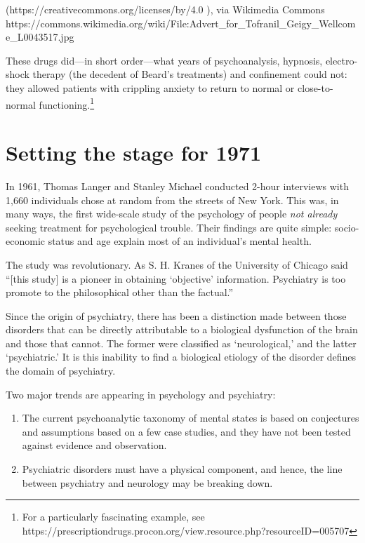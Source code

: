 \begin{refsection}
(https:\slash \slash creativecommons.org\slash licenses\slash by\slash 4.0 ), via Wikimedia Commons https:\slash \slash commons.wikimedia.org\slash wiki\slash File:Advert\_for\_Tofranil\_Geigy\_Wellcome\_L0043517.jpg 

These drugs did---in short order---what years of psychoanalysis, hypnosis, electro-shock therapy (the decedent of Beard's treatments) and confinement could not: they allowed patients with crippling anxiety to return to normal or close-to-normal functioning.\footnote{For a particularly fascinating example, see https:\slash \slash prescriptiondrugs.procon.org\slash view.resource.php?resourceID=005707}

\section{Setting the stage for 1971}
\label{settingthestagefor1971}

In 1961, Thomas Langer and Stanley Michael conducted 2-hour interviews with 1,660 individuals chose at random from the streets of New York. This was, in many ways, the first wide-scale study of the psychology of people \emph{not already} seeking treatment for psychological trouble. Their findings are quite simple: socio-economic status and age explain most of an individual's mental health. 

The study was revolutionary. As S. H. Kranes of the University of Chicago said ``[this study] is a pioneer in obtaining `objective' information. Psychiatry is too promote to the philosophical other than the factual.'' ~\citep{Kraines:1964fy}

Since the origin of psychiatry, there has been a distinction made between those disorders that can be directly attributable to a biological dysfunction of the brain and those that cannot. The former were classified as `neurological,' and the latter `psychiatric.' It is this inability to find a biological etiology of the disorder defines the domain of psychiatry.

Two major trends are appearing in psychology and psychiatry: 

\begin{enumerate}
\item The current psychoanalytic taxonomy of mental states is based on conjectures and assumptions based on a few case studies, and they have not been tested against evidence and observation.

\item Psychiatric disorders must have a physical component, and hence, the line between psychiatry and neurology may be breaking down.


\end{enumerate}
\end{refsection}
